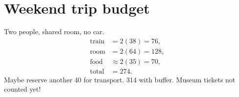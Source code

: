 \documentclass{article}
\begin{document}
\section{Weekend trip budget}
Two people, shared room, no car.
\begin{align*}
\text{train} &= 2(38)=76,\\
\text{room} &= 2(64)=128,\\
\text{food} &\approx 2(35)=70,\\
\text{total} &= \boxed{274}.
\end{align*}
Maybe reserve another 40 for transport.
 314 with buffer.
Museum tickets not counted yet!
\end{document}
